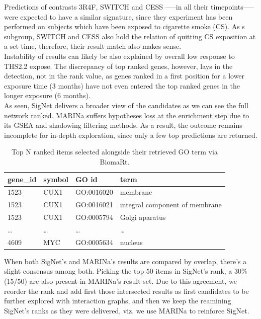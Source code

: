 Predictions of contrasts 3R4F, SWITCH and CESS —--in all their timepoints—-- were expected to have a similar signature, since they experiment has been performed on subjects which have been exposed to cigarette smoke (CS). As s subgroup, SWITCH and CESS also hold the relation of quitting CS exposition at a set time, therefore, their result match also makes sense.
\\

Instability of results can likely be also explained by overall low response to THS2.2 expose. The discrepancy of top ranked genes, however, lays in the detection, not in the rank value, as genes ranked in a first position for a lower exposure time (3 months) have not even entered the top ranked genes in the longer exposure (6 months).
\\

As seen, SigNet delivers a broader view of the candidates as we can see the full network ranked. MARINa suffers hypotheses loss at the enrichment step due to its GSEA and shadowing filtering methods. As a result, the outcome remains incomplete for in-depth exploration, since only a few top predictions are returned.
\\

\begin{table}[h]
\centering
\begin{tabular}{|l|l|l|l|}
\hline
gene\_id & symbol & GO id      & term                           \\ \hline
1523     & CUX1   & GO:0016020 & membrane                       \\ \hline
1523     & CUX1   & GO:0016021 & integral component of membrane \\ \hline
1523     & CUX1   & GO:0005794 & Golgi aparatus                 \\ \hline
…        & …      & …          & …                              \\ \hline
4609     & MYC    & GO:0005634 & nucleus                        \\ \hline
\end{tabular}
\caption{Top N ranked items selected alongside their retrieved GO term via BiomaRt.}
\label{tbl:goterms}
\end{table}

When both SigNet's and MARINa's results are compared by overlap, there’s a slight consensus among both. Picking the top 50 items in SigNet's rank, a 30\% (15/50) are also present in MARINa’s result set. Due to this agreement, we reorder the rank and add first those intersected results as first candidates to be further explored with interaction graphs, and then we keep the reamining SigNet's ranks as they were delivered, viz. we use MARINa to reinforce SigNet.
\\

